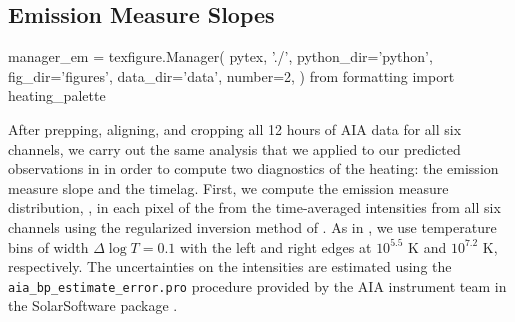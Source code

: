 \subsection{Emission Measure Slopes}\label{sec:em_slopes}

\begin{pycode}[manager_em]
manager_em = texfigure.Manager(
    pytex, './',
    python_dir='python',
    fig_dir='figures',
    data_dir='data',
    number=2,
)
from formatting import heating_palette
\end{pycode}

After prepping, aligning, and cropping all 12 hours of AIA data for all six channels, we carry out the same analysis that we applied to our predicted observations in  in order to compute two diagnostics of the heating: the emission measure slope and the timelag. First, we compute the emission measure distribution, \dem, in each pixel of the \AR{} from the time-averaged intensities from all six channels using the regularized inversion method of \citet{hannah_differential_2012}. As in , we use temperature bins of width $\Delta\log T=0.1$ with the left and right edges at $10^{5.5}$ K and $10^{7.2}$ K, respectively. The uncertainties on the intensities are estimated using the \texttt{aia\_bp\_estimate\_error.pro} procedure provided by the AIA instrument team in the SolarSoftware package \citep[SSW,][]{freeland_data_1998}.  


